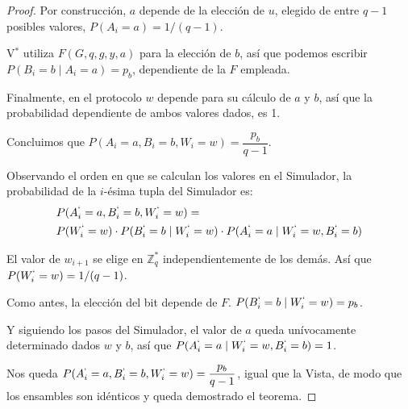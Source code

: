 \begin{proof}
	Por construcción, $a$ depende de la elección de $u$, elegido de entre $q-1$ posibles valores, $P(A_i = a) = 1/(q-1)$.
	
	V$^*$ utiliza $F(G,q,g,y,a)$ para la elección de $b$, así que podemos escribir $P(B_i = b \mid A_i = a) = p_b$, dependiente de la $F$ empleada.
	
	Finalmente, en el protocolo $w$ depende para su cálculo de $a$ y $b$, así que la probabilidad dependiente de ambos valores dados, es 1.
	
	Concluimos que $P(A_i=a, B_i=b, W_i = w) = \dfrac{p_b}{q-1}$.
	
	\hfil
	
	Observando el orden en que se calculan los valores en el Simulador, la probabilidad de la $i$-ésima tupla del Simulador es:
	\begin{align*}
	& P(A_i^`=a, B_i^`=b, W_i^` = w) = \\
	& P(W_i^` = w) \cdot P(B_i^` = b \mid W_i^` = w) \cdot P(A_i^` = a \mid W_i^` = w, B_i^`=b)
	\end{align*}
	
	El valor de $w_{i+1}$ se elige en $\mathbb{Z}_q^*$ independientemente de los demás. Así que $P(W_i^` = w) =  1/(q-1)$.
	
	Como antes, la elección del bit depende de $F$. $  P(B_i^` = b \mid W_i^` = w) = p_b $.
	
	Y siguiendo los pasos del Simulador, el valor de $a$ queda unívocamente determinado dados $w$ y $b$, así que $P(A_i^` = a \mid W_i^` = w, B_i^`=b) = 1$.
	
	Nos queda $ P(A_i^`=a, B_i^`=b, W_i^` = w) = \dfrac{p_b}{q-1}$, igual que la Vista, de modo que los ensambles son idénticos y queda demostrado el teorema.
	
\end{proof}





